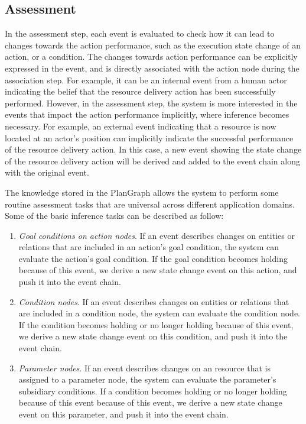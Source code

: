 \subsection{Assessment} %
\label{sub:assessment}
In the assessment step, each event is evaluated to check how it can lead to changes towards the action performance, such as the execution state change of an action, or a condition. The changes towards action performance can be explicitly expressed in the event, and is directly associated with the action node during the association step. For example, it can be an internal event from a human actor indicating the belief that the resource delivery action has been successfully performed. However, in the assessment step, the system is more interested in the events that impact the action performance implicitly, where inference becomes necessary. For example, an external event indicating that a resource is now located at an actor's position can implicitly indicate the successful performance of the resource delivery action. In this case, a new event showing the state change of the resource delivery action will be derived and added to the event chain along with the original event.

The knowledge stored in the PlanGraph allows the system to perform some routine assessment tasks that are universal across different application domains. Some of the basic inference tasks can be described as follow:
\begin{enumerate}
	\item \emph{Goal conditions on action nodes}. If an event describes changes on entities or relations that are included in an action's goal condition, the system can evaluate the action's goal condition. If the goal condition becomes holding because of this event, we derive a new state change event on this action, and push it into the event chain.
	\item \emph{Condition nodes}. If an event describes changes on entities or relations that are included in a condition node, the system can evaluate the condition node. If the condition becomes holding or no longer holding because of this event, we derive a new state change event on this condition, and push it into the event chain. 
	\item \emph{Parameter nodes}. If an event describes changes on an resource that is assigned to a parameter node, the system can evaluate the parameter's subsidiary conditions. If a  condition becomes holding or no longer holding because of this event because of this event, we derive a new state change event on this parameter, and push it into the event chain.
\end{enumerate}

